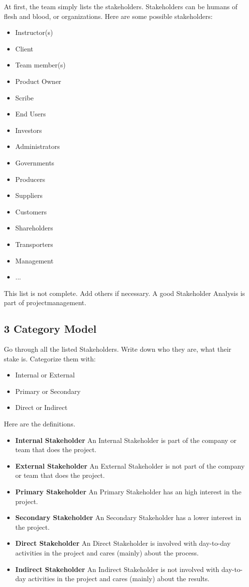 \documentclass[10pt]{report}
\begin{document}
At first, the team simply lists the stakeholders. Stakeholders can be humans of flesh and blood, or organizations. Here are some possible stakeholders:

\begin{itemize}
	\item Instructor(s)
	\item Client
	\item Team member(s)
	\item Product Owner
	\item Scribe
	\item End Users
	\item Investors
	\item Administrators
	\item Governments
	\item Producers
	\item Suppliers
	\item Customers
	\item Shareholders
	\item Transporters
	\item Management
	\item ...
\end{itemize}

This list is not complete. Add others if necessary. A good Stakeholder Analysis is part of projectmanagement.

\subsection{3 Category Model}

Go through all the listed Stakeholders. Write down who they are, what their stake is. Categorize them with:

\begin{itemize}
	\item Internal or External
	\item Primary or Secondary
	\item Direct or Indirect
\end{itemize}

Here are the definitions.

\begin{itemize}
	\item \textbf{Internal Stakeholder} An Internal Stakeholder is part of the company or team that does the project.
	\item \textbf{External Stakeholder} An External Stakeholder is not part of the company or team that does the project.
	\item \textbf{Primary Stakeholder} An Primary Stakeholder has an high interest in the project.
	\item \textbf{Secondary Stakeholder} An Secondary Stakeholder has a lower interest in the project.
	\item \textbf{Direct Stakeholder} An Direct Stakeholder is involved with day-to-day activities in the project and cares (mainly) about the process.
	\item \textbf{Indirect Stakeholder} An Indirect Stakeholder is not involved with day-to-day activities in the project and cares (mainly) about the results.
\end{itemize}
\end{document}
